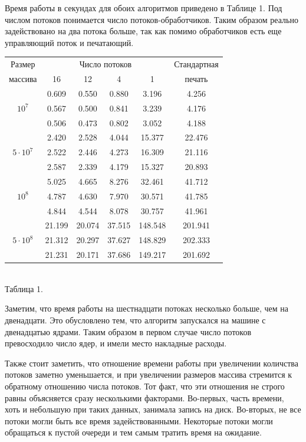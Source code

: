 Время работы в секундах для обоих алгоритмов приведено в Таблице 1.
Под числом потоков понимается число потоков-обработчиков. 
Таким образом реально задействовано на два потока больше, так как помимо обработчиков есть еще управляющий поток и печатающий.
\begin{center}
\begin{tabular}{||c|c|c|c|c|c||}
\hline
\hline
Размер & \multicolumn{4}{c|}{Число потоков} & Стандартная\\
\hhline{~|-|-|-|-|~|}
массива & 16 & 12 & 4 & 1 & печать \\
\hline
\hline
& 0.609 & 0.550 & 0.880 & 3.196 & 4.256 \\
\hhline{~|-|-|-|-|-|}
$10^7$ & 0.567 & 0.500 & 0.841 & 3.239 & 4.176 \\
\hhline{~|-|-|-|-|-|}
& 0.506 &0.473 & 0.802 & 3.052 & 4.188 \\
\hline
& 2.420 & 2.528 & 4.044 & 15.377 & 22.476 \\
\hhline{~|-|-|-|-|-|}
$5 \cdot 10^7$  & 2.522 & 2.446 & 4.273 & 16.309 & 21.116\\
\hhline{~|-|-|-|-|-|}
& 2.587 & 2.339 & 4.179 & 15.327 & 20.893 \\
\hline
& 5.025 & 4.665 & 8.276 & 32.461 & 41.712 \\
\hhline{~|-|-|-|-|-|}
$10^8$  & 4.787 & 4.630 & 7.970 & 30.571 & 41.785 \\
\hhline{~|-|-|-|-|-|}
& 4.844 & 4.544 & 8.078 & 30.757 & 41.961 \\
\hline
& 21.199 & 20.074 & 37.515 & 148.548 & 201.941 \\
\hhline{~|-|-|-|-|-|}
$5 \cdot 10^8$  & 21.312 & 20.297 & 37.627 & 148.829 & 202.333 \\
\hhline{~|-|-|-|-|-|}
 & 21.231 & 20.171 & 37.686 & 149.217 & 201.692 \\
\hline
\hline
\end{tabular}\\ \vspace{10pt}
\small{Таблица 1.}
\end{center}
Заметим, что время работы на шестнадцати потоках несколько больше, чем на двенадцати. 
Это обусловлено тем, что алгоритм запускался на машине с двенадцатью ядрами.
Таким образом в первом случае число потоков превосходило число ядер, и имели место накладные расходы.

Также стоит заметить, что отношение времени работы при увеличении количства потоков заметно уменьшается, и при увеличении размеров массива стремится к обратному отношению числа потоков.
Тот факт, что эти отношения не строго равны объясняется сразу несколькими факторами.
Во-первых, часть времени, хоть и небольшую при таких данных, занимала запись на диск.
Во-вторых, не все потоки могли быть все время задействованными.
Некоторые потоки могли обращаться к пустой очереди и тем самым тратить время на ожидание.

